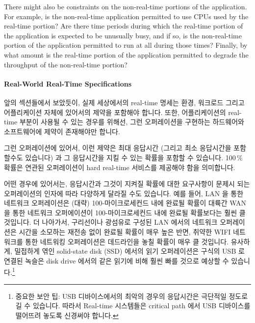 There might also be constraints on the non-real-time portions of the
application.
For example, is the non-real-time application permitted to use CPUs used
by the real-time portion?
Are there time periods during which the real-time portion of the application
is expected to be unusually busy, and if so, is the non-real-time portion
of the application permitted to run at all during those times?
Finally, by what amount is the real-time portion of the application permitted
to degrade the throughput of the non-real-time portion?
\fi

\paragraph{Real-World Real-Time Specifications}
\label{sec:advsync:Real-World Real-Time Specifications}

앞의 섹션들에서 보았듯이, 실제 세상에서의 real-time 명세는 환경, 워크로드
그리고 어플리케이션 자체에 있어서의 제약을 포함해야 합니다.
또한, 어플리케이션의 real-time 부분이 사용될 수 있는 경우를 위해선, 그런
오퍼레이션을 구현하는 하드웨어와 소프트웨어에 제약이 존재해야만 합니다.

그런 오퍼레이션에 있어서, 이런 제약은 최대 응답시간 (그리고 최소 응답시간을
포함할수도 있습니다) 과 그 응답시간을 지킬 수 있는 확률을 포함할 수 있습니다.
100\,\% 확률은 연관된 오퍼레이션이 hard real-time 서비스를 제공해야 함을
의미합니다.

어떤 경우에 있어서는, 응답시간과 그것이 지켜질 확률에 대한 요구사항이 문제시
되는 오퍼레이션의 인자에 따라 다양하게 달라질 수도 있습니다.
예를 들어, LAN 을 통한 네트워크 오퍼레이션은 (대략) 100-마이크로세컨드 내에
완료될 확률이 대륙간 WAN 을 통한 네트워크 오퍼에이션이 100-마이크로세컨드 내에
완료될 확률보다는 훨씬 클 것입니다.
더 나아가서, 구리선이나 광섬유로 구성된 LAN 에서의 네트워크 오퍼레이션은 시간을
소모하는 재전송 없이 완료될 확률이 매우 높은 반면, 취약한 WIFI 네트워크를 통한
네트워킹 오퍼레이션은 데드라인을 놓칠 확률이 매우 클 것입니다.
유사하게, 밀접하게 엮인 solid-state disk (SSD) 에서의 읽기 오퍼레이션은 구식의
USB 로 연결된 녹슬은 disk drive 에서의 같은 읽기에 비해 훨씬 빠를 것으로 예상할
수 있습니다.\footnote{
	중요한 보안 팁: USB 디바이스에서의 최악의 경우의 응답시간은 극단적일
	정도로 길 수 있습니다.
	따라서 Real-time 시스템들은 critical path 에서 USB 디바이스를 떨어뜨려
	놓도록 신경써야 합니다.}
\iffalse

